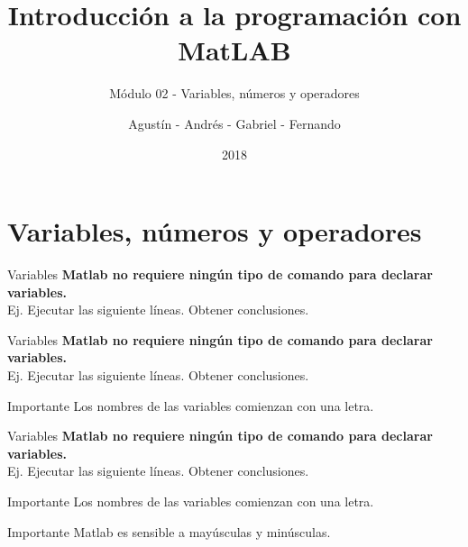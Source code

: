 \documentclass{bredelebeamer}
\title[Programación en MatLAB]{Introducción a la programación con MatLAB}
\subtitle{Módulo 02 - Variables, números y operadores}
\author{Agustín - Andrés - Gabriel - Fernando\inst{1}}
\institute[UTN.BA]
{
  \inst{1}%
  Universidad Tecnológica Nacional\\
  Facultad Regional Buenos Aires
  }
\date{2018}
\begin{document}
\begin{frame}
  \titlepage 
\end{frame}




\section{Variables, números y operadores}

\begin{frame}{Variables}
\textbf{Matlab no requiere ningún tipo de comando para declarar variables.}\\
Ej. Ejecutar las siguiente líneas. Obtener conclusiones.

\end{frame}

\begin{frame}{Variables}
\textbf{Matlab no requiere ningún tipo de comando para declarar variables.}\\
Ej. Ejecutar las siguiente líneas. Obtener conclusiones.

\begin{alertblock}{Importante}
Los nombres de las variables comienzan con una letra.
\end{alertblock}
\end{frame}

\begin{frame}{Variables}
\textbf{Matlab no requiere ningún tipo de comando para declarar variables.}\\
Ej. Ejecutar las siguiente líneas. Obtener conclusiones.

\begin{alertblock}{Importante}
Los nombres de las variables comienzan con una letra.
\end{alertblock}
\begin{alertblock}{Importante}
Matlab es sensible a mayúsculas y minúsculas.
\end{alertblock}
\end{frame}
\end{document}
